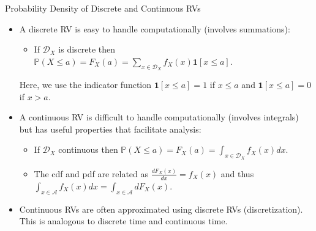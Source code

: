 \documentclass[9pt]{beamer}
\begin{document}
%
\begin{frame}{Probability Density of Discrete and Continuous RVs}

\begin{itemize}
\item A discrete RV is easy to handle computationally  (involves summations):
\begin{itemize}
\item If $\mathcal{D}_X$ is discrete then $\mathbb{P}(X\leq a)=F_X(a)=\sum_{x\in \mathcal{D}_X}f_X(x)\mathbf{1}[x\leq a]$. 
\end{itemize}
Here, we use the indicator function $\mathbf{1}[x\leq a]=1$ if $x\leq a$ and $\mathbf{1}[x\leq a]=0$ if $x> a$. 

\item A continuous RV is difficult to handle computationally (involves integrals) but has useful properties that facilitate analysis:
\begin{itemize}
\item If $\mathcal{D}_X$ continuous then $\mathbb{P}(X\leq a)=F_X(a)=\int_{x\in \mathcal{D}_X}f_X(x)dx$. 
\item The cdf and pdf are related as $\frac{dF_X(x)}{dx}=f_X(x)$ and thus $\int_{x\in \mathcal{A}}f_X(x)dx=\int_{x\in \mathcal{A}}dF_X(x)$.
\end{itemize}

\item Continuous RVs are often approximated using discrete RVs (discretization). This is analogous to discrete time and continuous time. 

\end{itemize}


\end{frame}
\end{document}
